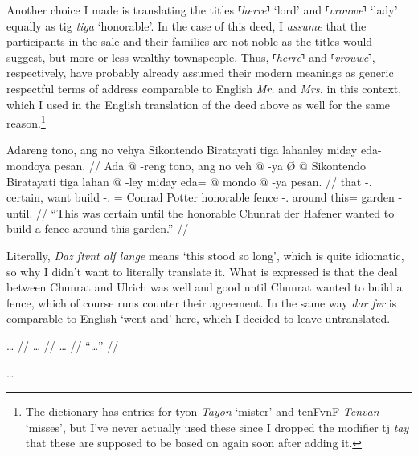 \documentclass[12pt,paper=a4]{scrartcl}
\newcommand{\fw}[1]{\textit{#1}} %
\newcommand{\norm}[1]{⸢\textit{#1}⸣} %
\newcommand{\ayr}[1]{{\Tagati #1}}
\newcommand{\xayr}[3]{{\Tagati #1} \emph{#2} \enquote*{#3}}
\begin{document}
Another choice I made is translating the titles \norm{herre} `lord' and 
\norm{vrouwe} `lady' equally as \xayr{tig}{tiga} {honorable}. In the case of 
this deed, I \emph{assume} that the participants in the sale and their families 
are not noble as the titles would suggest, but more or less wealthy townspeople. 
Thus, \norm{herre} and \norm{vrouwe}, respectively, have probably already 
assumed their modern meanings as generic respectful terms of address comparable 
to English \fw{Mr.} and \fw{Mrs.} in this context, which I used in the English 
translation of the deed above as well for the same reason.\footnote{The 
dictionary has entries for \xayr{tyon}{Tayon}{mister} and 
\xayr{tenFvnF}{Tenvan}{misses}, but I've never actually used these since I 
dropped the modifier \ayr{tj} \fw{tay} that these are supposed to be based on 
again soon after adding it.}


\ex \begingl
	\glpreamble Adareng tono, ang no vehya Sikontendo Biratayati tiga
		lahanley miday eda-mondoya pesan. //
	\gla Ada @ -reng tono, ang no veh @ -ya Ø @ Sikontendo Biratayati tiga 
		lahan @ -ley miday eda= @ mondo @ -ya pesan. //
	\glb that -\Aarg{}.\Inan{} certain, \AgtT{} want build -\Tsg{}.\M{}
		\Top{}= Conrad Potter honorable fence -\Parg{}.\Inan{} around 
		this= garden -\Loc{} until. //
	\glft \enquote{This was certain until the honorable Chunrat der Hafener 
		wanted to build a fence around this garden.} //
\endgl \xe

Literally, \fw{Daz ſtvnt alſ lange} means `this stood so long', which is 
quite idiomatic, so why I didn't want to literally translate it. What is 
expressed is that the deal between Chunrat and Ulrich was well and good until 
Chunrat wanted to build a fence, which of course runs counter their agreement. 
In the same way \fw{dar fvr} is comparable to English `went and' here, which 
I decided to leave untranslated.


\ex \begingl
	\glpreamble … //
	\gla … //
	\glb … //
	\glft \enquote{…} //
\endgl \xe

…

\end{document}
